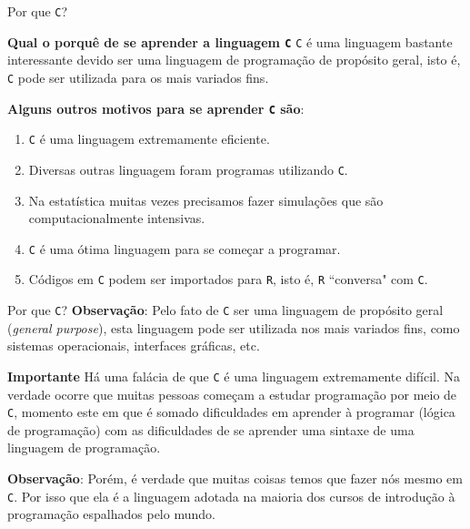 \documentclass{beamer}
\newcommand{\C}{\texttt{C}}
\begin{document}
\begin{frame}{Por que \C?}

\begin{block}{\textbf{Qual o porquê de se aprender a linguagem \C}} 
\C \hspace{0.03cm} é uma linguagem bastante interessante devido ser uma linguagem de programação de propósito geral, isto é, \C \hspace{0.03cm} pode ser utilizada para os mais variados fins.
\end{block}
\textbf{Alguns outros motivos para se aprender \texttt{C} são}:

\begin{enumerate}
\pause	\item \texttt{C} é uma linguagem extremamente eficiente. 
\pause	\item Diversas outras linguagem foram programas utilizando \C.
\pause	\item Na estatística muitas vezes precisamos fazer simulações que são computacionalmente intensivas.
\pause	\item \texttt{C} é uma ótima linguagem para se começar a programar.
\pause	\item Códigos em \texttt{C} podem ser importados para \texttt{R}, isto é, \texttt{R} ``conversa" com \texttt{C}.
\end{enumerate}
\end{frame}

\begin{frame}{Por que \C?}
\textbf{Observação}: Pelo fato de \texttt{C} ser uma linguagem de propósito geral (\textit{general purpose}), esta linguagem pode ser utilizada nos mais variados fins, como sistemas operacionais, interfaces gráficas, etc. 
\begin{block}{\textbf{Importante}}
Há uma falácia de que \texttt{C} é uma linguagem extremamente difícil. Na verdade ocorre que muitas pessoas começam a estudar programação por meio de \texttt{C}, momento este em que é somado dificuldades em aprender à programar (lógica de programação) com as dificuldades de se aprender uma sintaxe de uma linguagem de programação.
\end{block}
\textbf{Observação}: Porém, é verdade que muitas coisas temos que fazer nós mesmo em \texttt{C}. Por isso que ela é a linguagem adotada na maioria dos cursos de introdução à programação espalhados pelo mundo.
\end{frame}
\end{document}

